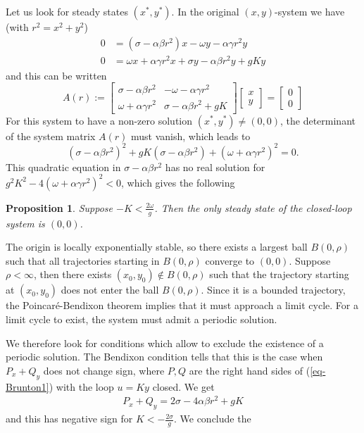 \documentclass[12pt, a4paper,reqno]{amsart}
\newcommand{\y}{\mathbf y}
\newtheorem{proposition}{\bf Proposition}
\theoremstyle{definition}
\begin{document}
Let us look for steady states $(x^*,y^*)$.
In the original $(x,y)$-system we have (with $r^2=x^2+y^2$)
\begin{align*}
    0&= (\sigma-\alpha\beta r^2) x - \omega y - \alpha\gamma r^2 y\\
    0& =\omega x + \alpha\gamma r^2 x +  \sigma y-\alpha\beta r^2 y+gKy
\end{align*}
and this can be written
$$
A(r):=\begin{bmatrix}
    \sigma-\alpha \beta r^2 & -\omega -\alpha\gamma r^2 \\
     \omega+\alpha \gamma r^2 & \sigma- \alpha\beta r^2 + gK
\end{bmatrix}
\begin{bmatrix} x\\y\end{bmatrix}=\begin{bmatrix}0\\0\end{bmatrix}
$$
For this system to have a non-zero solution $(x^*,y^*)\not=(0,0)$, the determinant of the system matrix
$A(r)$
must vanish, which leads to
$$
(\sigma-\alpha\beta r^2)^2 + gK(\sigma-\alpha\beta r^2) + (\omega+\alpha \gamma r^2)^2=0.
$$
This quadratic equation in $\sigma-\alpha \beta r^2$ has no real solution
for $g^2K^2-4(\omega+\alpha\gamma r^2)^2 < 0$, which gives the following
\begin{proposition}
    Suppose $-K < \frac{2\omega}{g}$. Then the only steady state of the closed-loop system is $(0,0)$.
\end{proposition}

The origin is locally exponentially stable, so there exists a largest ball $B(0,\rho)$ such that all trajectories
starting in $B(0,\rho)$ converge to $(0,0)$. Suppose $\rho < \infty$, then there exists $(x_0,y_0)\not\in B(0,\rho)$ such that
the trajectory starting at $(x_0,y_0)$ does not enter the ball $B(0,\rho)$. Since it is a bounded trajectory,
the Poincar\'e-Bendixon theorem implies that it must approach a limit cycle. For a limit cycle to exist, the system
must admit a periodic solution.

We therefore look for conditions which allow to exclude the existence of a periodic solution. The Bendixon condition
tells that this is the case when $P_x+Q_y$ does not change sign, where $P,Q$ are the right hand sides
of (\ref{eq-Brunton1}) with the loop $u=Ky$ closed. We get
\begin{align*}
    P_x+Q_y = 2 \sigma - 4 \alpha \beta r^2 + gK
\end{align*}
and this has negative sign for $K < -\frac{2\sigma}{g}$. We conclude the
\end{document}
